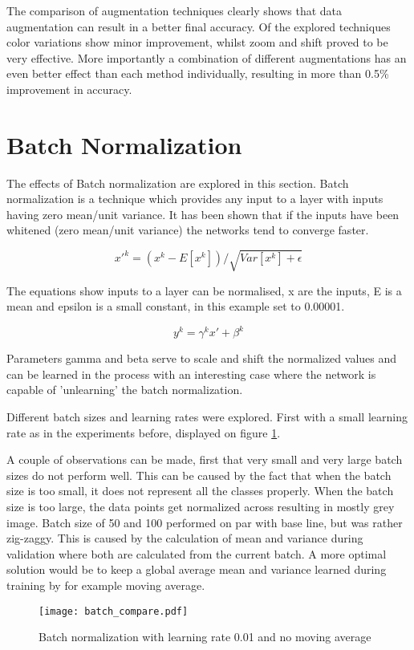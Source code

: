\documentclass[12pt]{article}
\begin{document}
The comparison of augmentation techniques clearly shows that data augmentation can result in a better final accuracy. Of the explored techniques color variations show minor improvement, whilst zoom and shift proved to be very effective. More importantly a combination of different augmentations has an even better effect than each method individually, resulting in more than 0.5\% improvement in accuracy.

\section*{Batch Normalization}

The effects of Batch normalization are explored in this section. Batch normalization is a technique which provides any input to a layer with inputs having zero mean/unit variance. It has been shown that if the inputs have been whitened (zero mean/unit variance) the networks tend to converge faster.

\[ x'^k = (x^k-E[x^k])/\sqrt{Var[x^k]+\epsilon}\] 

The equations show inputs to a layer can be normalised, x are the inputs, E is a mean and epsilon is a small constant, in this example set to 0.00001.

\[ y^k = \gamma^kx'+\beta^k\] 

Parameters gamma and beta serve to scale and shift the normalized values and can be learned in the process with an interesting case where the network is capable of 'unlearning' the batch normalization.

Different batch sizes and learning rates were explored. First with a small learning rate as in the experiments before, displayed on figure \ref{fig:batch}. 

A couple of observations can be made, first that very small and very large batch sizes do not perform well. This can be caused by the fact that when the batch size is too small, it does not represent all the classes properly. When the batch size is too large, the data points get normalized across resulting in mostly grey image. Batch size of 50 and 100 performed on par with base line, but was rather zig-zaggy. This is caused by the calculation of mean and variance during validation where both are calculated from the current batch. A more optimal solution would be to keep a global average mean and variance learned during training by for example moving average.



\begin{figure}[H]
\centering
\texttt{[image: batch\_compare.pdf]}

  \caption{Batch normalization with learning rate 0.01 and no moving average}
  \label{fig:batch}
\end{figure}
\end{document}
